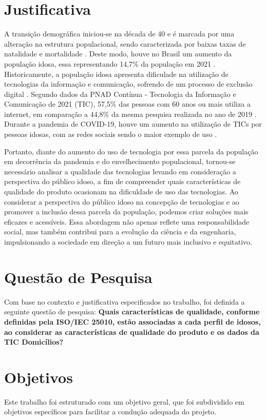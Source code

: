 \section{Justificativa}

A transição demográfica iniciou-se na década de 40 e é marcada por uma alteração na estrutura populacional, sendo caracterizada por baixas taxas de natalidade e mortalidade \cite{omran_epidemiologic_2005}. Deste modo, houve no Brasil um aumento da população idosa, essa representando 14,7\% da população em 2021 \cite{ibge_caracteristicas_gerais}. Historicamente, a população idosa apresenta dificulade na utilização de tecnologias da informação e comunicação, sofrendo de um processo de exclusão digital \cite{diniz_inclusao_2020}. Segundo dados da PNAD Contínua - Tecnologia da Informação e Comunicação de 2021 (TIC), 57,5\% das pessoas com 60 anos ou mais utiliza a internet, em comparação a 44,8\% da mesma pesquisa realizada no ano de 2019 \cite{ibge_acesso_a_Internet}. Durante a pandemia de COVID-19, houve um aumento na utilização de TICs por pessoas idosas, com as redes sociais sendo o maior exemplo de uso \cite{sixsmith_older_2022}.

Portanto, diante do aumento do uso de tecnologia por essa parcela da população em decorrência da pandemia e do envelhecimento populacional, tornou-se necessário analisar a qualidade das tecnologias levando em consideração a perspectiva do público idoso, a fim de compreender quais características de qualidade do produto ocasionam na dificuldade de uso das tecnologias. Ao considerar a perspectiva do público idoso na concepção de tecnologias e ao promover a inclusão dessa parcela da população, podemos criar soluções mais eficazes e acessíveis. Essa abordagem não apenas reflete uma responsabilidade social, mas também contribui para a evolução da ciência e da engenharia, impulsionando a sociedade em direção a um futuro mais inclusivo e equitativo.

\section{Questão de Pesquisa}
Com base no contexto e justificativa especificados no trabalho, foi definida a seguinte questão de pesquisa: \textbf{Quais características de qualidade, conforme definidas pela ISO/IEC 25010, estão associadas a cada perfil de idosos, ao considerar as características de qualidade do produto e os dados da TIC Domicílios?}

\section{Objetivos}
Este trabalho foi estruturado com um objetivo geral, que foi subdividido em objetivos específicos para facilitar a condução adequada do projeto.

